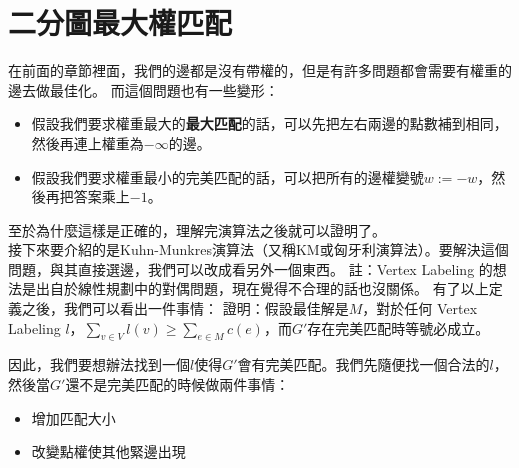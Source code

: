 \section{二分圖最大權匹配}
在前面的章節裡面，我們的邊都是沒有帶權的，但是有許多問題都會需要有權重的邊去做最佳化。
而這個問題也有一些變形：
\begin{itemize}
    \item 假設我們要求權重最大的\textbf{最大匹配}的話，可以先把左右兩邊的點數補到相同，然後再連上權重為$- \infty$的邊。
    \item 假設我們要求權重最小的完美匹配的話，可以把所有的邊權變號$w := -w$，然後再把答案乘上$-1$。
\end{itemize}
至於為什麼這樣是正確的，理解完演算法之後就可以證明了。 \\
接下來要介紹的是Kuhn-Munkres演算法（又稱KM或匈牙利演算法）。要解決這個問題，與其直接選邊，我們可以改成看另外一個東西。
註：Vertex Labeling 的想法是出自於線性規劃中的對偶問題，現在覺得不合理的話也沒關係。
有了以上定義之後，我們可以看出一件事情：
證明：假設最佳解是$M$，對於任何 Vertex Labeling $l$，$\sum_{v \in V} l(v) \geq \sum_{e \in M} c(e)$，而$G'$存在完美匹配時等號必成立。
\par 因此，我們要想辦法找到一個$l$使得$G'$會有完美匹配。我們先隨便找一個合法的$l$，然後當$G'$還不是完美匹配的時候做兩件事情：
\begin{itemize}
    \item 增加匹配大小
    \item 改變點權使其他緊邊出現
\end{itemize}
